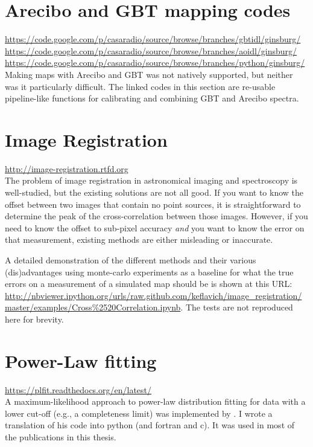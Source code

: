 \section{Arecibo and GBT mapping codes}
\url{https://code.google.com/p/casaradio/source/browse/branches/gbtidl/ginsburg/} \\
\url{https://code.google.com/p/casaradio/source/browse/branches/aoidl/ginsburg/} \\
\url{https://code.google.com/p/casaradio/source/browse/branches/python/ginsburg/} \\

Making maps with Arecibo and GBT was not natively supported, but neither was it
particularly difficult.  The linked codes in this section are re-usable
pipeline-like functions for calibrating and combining GBT and Arecibo spectra.

\section{Image Registration}
\url{http://image-registration.rtfd.org}\\
The problem of image registration in astronomical imaging and spectroscopy is
well-studied, but the existing solutions are not all good.  If you want to know
the offset between two images that contain no point sources, it is
straightforward to determine the peak of the cross-correlation between those
images.  However, if you need to know the offset to sub-pixel accuracy
\emph{and} you want to know the error on that measurement, existing methods are
either misleading or inaccurate.

A detailed demonstration of the different methods and their various
(dis)advantages using monte-carlo experiments as a baseline for what the true
errors on a measurement of a simulated map should be is shown at this URL:
\url{http://nbviewer.ipython.org/urls/raw.github.com/keflavich/image_registration/master/examples/Cross%2520Correlation.ipynb}.
The tests are not reproduced here for brevity.

\section{Power-Law fitting}
\url{https://plfit.readthedocs.org/en/latest/}\\
A maximum-likelihood approach to power-law distribution fitting for data with a
lower cut-off (e.g., a completeness limit) was implemented by
\citet{Clauset2007}.  I wrote a translation of his code into python (and
fortran and c).  It was used in most of the publications in this thesis.




